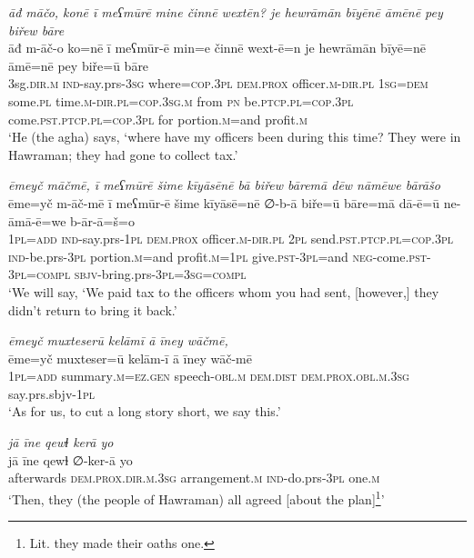 \ea \label{BP.57}
\textit{āđ māčo, konē ī meʕmūrē mine činnē wextēn? je hewrāmān bīyēnē āmēnē pey biřew bāre} \\ 
\gll āđ m-āč-o ko=nē ī meʕmūr-ē min=e činnē wext-ē=n je hewrāmān bīyē=nē āmē=nē pey biře=ū bāre \\ 
 3sg\textsc{.dir}\textsc{.m} \textsc{ind-}say.prs\textsc{-3sg} where\textsc{=cop}\textsc{.3pl} \textsc{dem.prox} officer\textsc{.m}\textsc{-dir}\textsc{.pl} \textsc{1sg}\textsc{=dem} some\textsc{.pl} time\textsc{.m}\textsc{-dir}\textsc{.pl}\textsc{=cop}\textsc{.3sg}\textsc{.m} from \textsc{pn} be\textsc{.ptcp}\textsc{.pl}\textsc{=cop}\textsc{.3pl} come\textsc{.pst}\textsc{.ptcp}\textsc{.pl}\textsc{=cop}\textsc{.3pl} for portion\textsc{.m}=and profit\textsc{.m} \\ 
\glt `He (the agha) says, ‘where have my officers been during this time? They were in Hawraman; they had gone to collect tax.'
\z 
 
\ea \label{BP.60}
\textit{ēmeyč māčmē, ī meʕmūrē šime kīyāsēnē bā biřew bāremā dēw nāmēwe bārāšo} \\ 
\gll ēme=yč m-āč-mē ī meʕmūr-ē šime kīyāsē=nē ∅-b-ā biře=ū bāre=mā dā-ē=ū ne-āmā-ē=we b-ār-ā=š=o \\ 
 \textsc{1pl}\textsc{=add} \textsc{ind-}say.prs\textsc{-\textsc{1pl}} \textsc{dem.prox} officer\textsc{.m}\textsc{-dir}\textsc{.pl} \textsc{2pl} send\textsc{.pst}\textsc{.ptcp}\textsc{.pl}\textsc{=cop}\textsc{.3pl} \textsc{ind-}be.prs\textsc{-3pl} portion\textsc{.m}=and profit\textsc{.m}\textsc{=\textsc{1pl}} give\textsc{.pst}\textsc{-3pl}=and \textsc{neg-}come\textsc{.pst}\textsc{-3pl}\textsc{=compl} \textsc{sbjv-}bring.prs\textsc{-3pl}\textsc{=3sg}\textsc{=compl} \\ 
\glt `We will say, ‘We paid tax to the officers whom you had sent, [however,] they didn’t return to bring it back.'
\z 
 
\ea \label{BP.63}
\textit{ēmeyč muxteserū kelāmī ā īney wāčmē,} \\ 
\gll ēme=yč muxteser=ū kelām-ī ā īney wāč-mē \\ 
 \textsc{1pl}\textsc{=add} summary\textsc{.m}\textsc{=ez.gen} speech\textsc{-obl}\textsc{.m} \textsc{dem.dist} \textsc{dem.prox}\textsc{.obl}\textsc{.m}\textsc{.3sg} say.prs.sbjv\textsc{-\textsc{1pl}} \\ 
\glt `As for us, to cut a long story short, we say this.'
\z 
 
\ea \label{BP.64}
\textit{jā īne qewɫ kerā yo} \\ 
\gll jā īne qewɫ ∅-ker-ā yo \\ 
 afterwards \textsc{dem.prox}\textsc{.dir}\textsc{.m}\textsc{.3sg} arrangement\textsc{.m} \textsc{ind-}do.prs\textsc{-3pl} one\textsc{.m} \\ 
\glt `Then, they (the people of Hawraman) all agreed [about the plan]\footnote{Lit. they made their oaths one.}'
\z 
 
